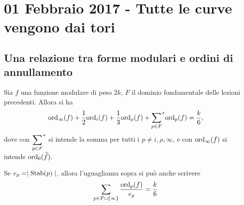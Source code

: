 \chapter{01 Febbraio 2017 - Tutte le curve vengono dai tori}

\section{Una relazione tra forme modulari e ordini di annullamento}

\begin{teorema} \label{170201-forme-ordini}
	Sia $f$ una funzione modulare di peso $2k$, $F$ il dominio fondamentale delle lezioni precedenti. Allora si ha
	\begin{equation*}
	\text{ord}_\infty(f)+\frac{1}{2}\text{ord}_i(f)+\frac{1}{3}\text{ord}_{\rho}(f)+{\sum_{p\in F}}^{*}\text{ord}_p(f)=\frac{k}{6},
	\end{equation*}
	dove con $\displaystyle{\sum_{p\in F}}^{*}$ si intende la somma per tutti i $p \neq i, \rho, \infty$, e con $\text{ord}_\infty(f)$ si intende $\text{ord}_0(\widetilde{f})$.
	
	Se $e_p=\mid \text{Stab}(p) \mid$, allora l'uguaglianza sopra si può anche scrivere
	\begin{equation*}
		\sum_{p\in F \cup \{\infty\}} \frac{\text{ord}_p(f)}{e_p}=\frac{k}{6}
	\end{equation*}
\end{teorema}

